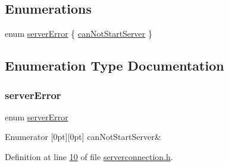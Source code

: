 \subsection*{Enumerations}
\begin{DoxyCompactItemize}
\item 
enum \hyperlink{a00104_a65727a063024ff0dedf1ac2f087f4165}{server\+Error} \{ \hyperlink{a00104_a65727a063024ff0dedf1ac2f087f4165af21059407733b78da140dbc07981a44a}{can\+Not\+Start\+Server}
 \}
\end{DoxyCompactItemize}


\subsection{Enumeration Type Documentation}
\mbox{\label{a00104_a65727a063024ff0dedf1ac2f087f4165}} 
\subsubsection{\texorpdfstring{server\+Error}{serverError}}
{\footnotesize\ttfamily enum \hyperlink{a00104_a65727a063024ff0dedf1ac2f087f4165}{server\+Error}}

\begin{DoxyEnumFields}{Enumerator}
[0pt][0pt]{}\mbox{\label{a00104_a65727a063024ff0dedf1ac2f087f4165af21059407733b78da140dbc07981a44a}} 
can\+Not\+Start\+Server&\\
\hline

\end{DoxyEnumFields}


Definition at line \hyperlink{a00104_source_l00010}{10} of file \hyperlink{a00104_source}{serverconnection.\+h}.


